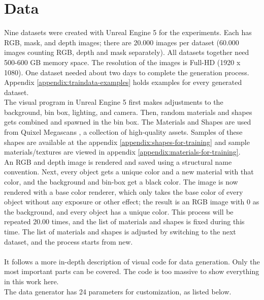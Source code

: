 	\section{Data}
	\label{sec:data}
		Nine datasets were created with Unreal Engine 5 \cite{ue5} for the experiments. Each has RGB, mask, and depth images; there are 20.000 images per dataset (60.000 images counting RGB, depth and mask separately). All datasets together need 500-600 GB memory space. The resolution of the images is Full-HD (1920 x 1080). One dataset needed about two days to complete the generation process. Appendix \ref{appendix:traindata-examples} holds examples for every generated dataset.\\
		The visual program in Unreal Engine 5 first makes adjustments to the background, bin box, lighting, and camera. Then, random materials and shapes gets combined and spawned in the bin box. The Materials and Shapes are used from Quixel Megascans \cite{Quixel}, a collection of high-quality assets. Samples of these shapes are available at the appendix \ref{appendix:shapes-for-training} and sample materials/textures are viewed in appendix \ref{appendix:materials-for-training}.\\
		An RGB and depth image is rendered and saved using a structural name convention. Next, every object gets a unique color and a new material with that color, and the background and bin-box get a black color. The image is now rendered with a base color renderer, which only takes the base color of every object without any exposure or other effect; the result is an RGB image with 0 as the background, and every object has a unique color. This process will be repeated 20.00 times, and the list of materials and shapes is fixed during this time. The list of materials and shapes is adjusted by switching to the next dataset, and the process starts from new.\\
		\\
		It follows a more in-depth description of visual code for data generation. Only the most important parts can be covered. The code is too massive to show everything in this work here.\\
		The data generator has 24 parameters for customization, as listed below.
